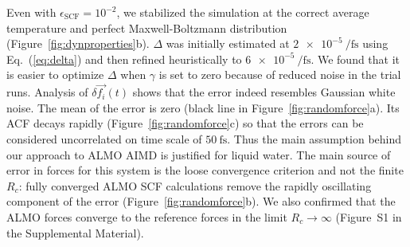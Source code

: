 \documentclass[aps,prl,reprint,amsmath,amssymb]{revtex4-1}
\begin{document}
Even with $\epsilon_{\text{SCF}} = 10^{-2}$, we stabilized the simulation at the correct average temperature and perfect Maxwell-Boltzmann distribution (Figure~\ref{fig:dynproperties}b). $\Delta$ was initially estimated at $\SI{2e-5}{\per\fs}$ using Eq.~(\ref{eq:delta}) and then refined heuristically to $\SI{6e-5}{\per\fs}$. 
We found that it is easier to optimize $\Delta$ when $\gamma$ is set to zero because of reduced noise in the trial runs. 
%
Analysis of $\delta \vec{f_{i}}(t)$ shows that the error indeed resembles Gaussian white noise. The mean of the error is zero (black line in Figure~\ref{fig:randomforce}a). Its ACF decays rapidly (Figure~\ref{fig:randomforce}c) so that the errors can be considered uncorrelated on time scale of $\SI{50}{\fs}$. Thus the main assumption behind our approach to ALMO AIMD is justified for liquid water. The main source of error in forces for this system is the loose convergence criterion and not the finite $R_c$: fully converged ALMO SCF calculations remove the rapidly oscillating component of the error (Figure~\ref{fig:randomforce}b). We also confirmed that the ALMO forces converge to the reference forces in the limit $R_{c} \rightarrow \infty$ 
(Figure~S1 in the Supplemental Material).


\end{document}
